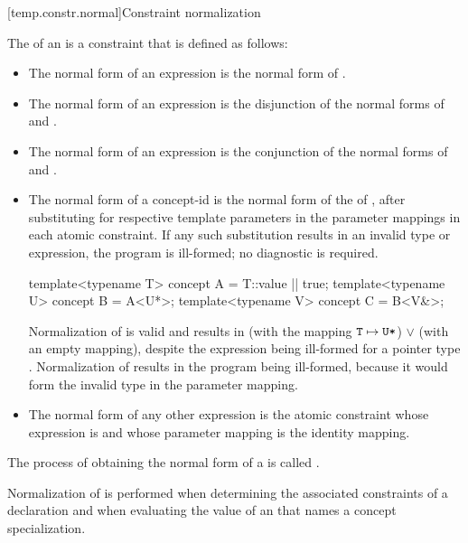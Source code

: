 [temp.constr.normal]{Constraint normalization}
%

\pnum
The  of an   is
a constraint that is defined as follows:
%
\begin{itemize}
\item
The normal form of an expression  is
the normal form of .

\item
The normal form of an expression  is
the disjunction of
the normal forms of  and .

\item
The normal form of an expression 
is the conjunction of
the normal forms of  and .

\item
The normal form of a concept-id 
is the normal form of the  of ,
after substituting  for
 respective template parameters in the
parameter mappings in each atomic constraint.
If any such substitution results in an invalid type or expression,
the program is ill-formed; no diagnostic is required.
\begin{example}
\begin{codeblock}
template<typename T> concept A = T::value || true;
template<typename U> concept B = A<U*>;
template<typename V> concept C = B<V&>;
\end{codeblock}
Normalization of  
is valid and results in
 (with the mapping $\texttt{\protect T} \mapsto \texttt{\protect U*}$)
$\lor$
 (with an empty mapping),
despite the expression  being ill-formed
for a pointer type .
Normalization of  
results in the program being ill-formed,
because it would form the invalid type 
in the parameter mapping.
\end{example}

\item
The normal form of any other expression  is
the atomic constraint
whose expression is  and
whose parameter mapping is the identity mapping.
\end{itemize}

\pnum
The process of obtaining the normal form of a
is called
.
\begin{note}
Normalization of 
is performed
when determining the associated constraints
of a declaration
and
when evaluating the value of an 
that names a concept specialization.
\end{note}

